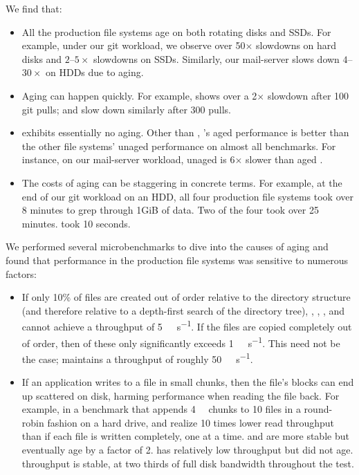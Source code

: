 We find that:
\begin{itemize}
\item All the production file systems age on both rotating disks and
  SSDs.  For example, under our git workload, we observe over
  50$\times$ slowdowns on hard disks and $2$--$5\times$ slowdowns on
  SSDs.  Similarly, our mail-server slows down $4$--$30\times$ 
  on HDDs due to aging.
\item Aging can happen quickly.  For example, \ext shows over a
  2$\times$ slowdown after 100 git pulls;
  \btrfs and \zfs slow down similarly after 300 pulls.
\item \betrfs exhibits essentially no aging.  
  Other than \btrfs, 
  \betrfs's aged performance is better than the other file systems'
  unaged performance on almost all benchmarks.
  For instance, on our mail-server workload, unaged \ext is 6$\times$ slower
  than aged \betrfs.
%
\item The costs of aging can be staggering in concrete terms.  For
  example, at the end of our git workload on an HDD, all four
  production file systems took over \num{8} minutes to
  grep through 1GiB of data.  Two of the four
  took over \num{25} minutes. \betrfs took \num{10} seconds.
\end{itemize}
%
We performed several microbenchmarks to dive into the causes of aging and
found that performance in the production file systems was sensitive to numerous
factors:

\begin{itemize} \item If only 10\% of files are created out of order
		relative to the directory structure (and therefore relative to a
		depth-first search of the directory tree), \btrfs, \ext, \ftwofs, \xfs
		and \zfs cannot achieve a throughput of
                \SI{5}{\mebi\byte\per\second}. If the files are copied completely out
		of order, then of these only \xfs significantly exceeds
                \SI{1}{\mebi\byte\per\second}. This need not be the case; \betrfs
                maintains a throughput of roughly \SI{50}{\mebi\byte\per\second}.
	\item If an application writes to a file in small chunks, then the file's
		blocks can end up scattered on disk, harming performance when reading
		the file back.  For example, in a benchmark that appends
                \SI{4}{\kibi\byte} chunks to 10 files in a round-robin fashion on a
		hard drive, \btrfs and \ftwofs realize 10 times lower read throughput
		than if each file is written completely, one at a time.
		\ext and \xfs are more stable but eventually age by a factor of 2. \zfs
		has relatively low throughput but did not age. \betrfs throughput is
		stable, at two thirds of full disk bandwidth throughout the test.
\end{itemize}
